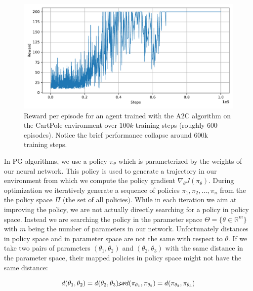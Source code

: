 \begin{figure}[ht]
  
  \begin{center}
      \includegraphics[clip, width=0.8\columnwidth]{figures/rl/a2c_cart_pole_plot.pdf}
  \end{center}
  
  \caption[Learning Curve for A2C on CartPole]{Reward per episode for an agent trained with the A2C algorithm on the CartPole environment over $100k$ training steps (roughly 600 episodes). Notice the brief performance collapse around 600k training steps.}
  \label{fig:a2c_cartpole}
\end{figure}

In PG algorithms, we use a policy $\pi_\theta$ which is parameterized by the weights of our neural network. This policy is used to generate a trajectory in our environment from which we compute the policy gradient $\nabla_\theta J(\pi_\theta)$. During optimization we iteratively generate a sequence of policies $\pi_1, \pi_2, \dots, \pi_n$ from the the policy space $\Pi$ (the set of all policies). While in each iteration we aim at improving the policy, we are not actually directly searching for a policy in policy space. Instead we are searching the policy in the parameter space $\Theta = \{\theta \in \mathbb{R}^m\}$ with $m$ being the number of parameters in our network. Unfortunately distances in policy space and in parameter space are not the same with respect to $\theta$. If we take two pairs of parameters $(\theta_1, \theta_2)$ and $(\theta_2, \theta_3)$ with the same distance in the parameter space, their mapped policies in policy space might not have the same distance:

\[d(\theta_1, \theta_2) = d(\theta_2, \theta_3) \cancel{\Leftrightarrow} d(\pi_{\theta_1}, \pi_{\theta_2}) = d(\pi_{\theta_2}, \pi_{\theta_3}) \]

